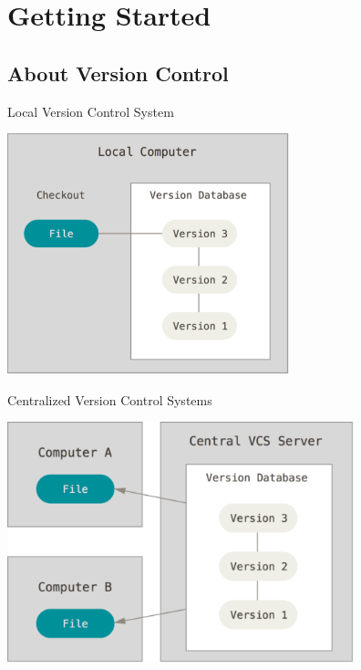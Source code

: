 \section{Getting Started}

\subsection{About Version Control}
\begin{frame}[t]{Local Version Control System}
  \begin{center}
    \includegraphics[height=2.75in]{../images/02-getting-started/local}
  \end{center}
\end{frame}

\begin{frame}[t]{Centralized Version Control Systems}
  \begin{center}
    \includegraphics[height=2.75in]{../images/02-getting-started/centralized}
  \end{center}
\end{frame}


